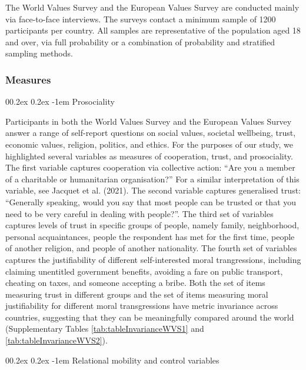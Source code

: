 \documentclass[
  man,floatsintext]{apa6}
\makeatletter
\let\oldparagraph\paragraph
\renewcommand{\paragraph}[1]{\oldparagraph{#1}\mbox{}}
\renewcommand{\paragraph}{\@startsection{paragraph}{4}{\parindent}%
  {0\baselineskip \@plus 0.2ex \@minus 0.2ex}%
  {-1em}%
  {\normalfont\normalsize\bfseries\itshape\typesectitle}}
\makeatother
\begin{document}
The World Values Survey and the European Values Survey are conducted mainly via face-to-face interviews. The surveys contact a minimum sample of 1200 participants per country. All samples are representative of the population aged 18 and over, via full probability or a combination of probability and stratified sampling methods.

\hypertarget{measures-1}{%
\subsubsection{Measures}\label{measures-1}}

\hypertarget{prosociality-1}{%
\paragraph{Prosociality}\label{prosociality-1}}

Participants in both the World Values Survey and the European Values Survey answer a range of self-report questions on social values, societal wellbeing, trust, economic values, religion, politics, and ethics. For the purposes of our study, we highlighted several variables as measures of cooperation, trust, and prosociality. The first variable captures cooperation via collective action: ``Are you a member of a charitable or humanitarian organisation?'' For a similar interpretation of this variable, see Jacquet et al. (2021). The second variable captures generalised trust: ``Generally speaking, would you say that most people can be trusted or that you need to be very careful in dealing with people?''. The third set of variables captures levels of trust in specific groups of people, namely family, neighborhood, personal acquaintances, people the respondent has met for the first time, people of another religion, and people of another nationality. The fourth set of variables captures the justifiability of different self-interested moral trangressions, including claiming unentitled government benefits, avoiding a fare on public transport, cheating on taxes, and someone accepting a bribe. Both the set of items measuring trust in different groups and the set of items measuring moral justifiability for different moral transgressions have metric invariance across countries, suggesting that they can be meaningfully compared around the world (Supplementary Tables \ref{tab:tableInvarianceWVS1} and \ref{tab:tableInvarianceWVS2}).

\hypertarget{relational-mobility-and-control-variables}{%
\paragraph{Relational mobility and control variables}\label{relational-mobility-and-control-variables}}
\end{document}

